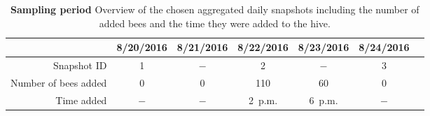 \begin{table}[htb]
\small
\centering
\caption[Sampling period]{\textbf{Sampling period} Overview of the chosen aggregated daily snapshots including the number of added bees and the time they were added to the hive.}
\vspace*{5mm}
\begin{tabularx}{\textwidth}{rcccccc}
\toprule
{} & 8/20/2016 & 8/21/2016 & 8/22/2016 & 8/23/2016 & 8/24/2016 \\
\midrule
Snapshot ID & 1 & $-$ & 2 & $-$ & 3 & \\
Number of bees added & 0 & 0 & 110 & 60 & 0 \\
Time added & $-$ & $-$ & 2~p.m. & 6~p.m. & $-$ \\
\bottomrule
\end{tabularx}
\label{tab:networks}
\end{table}
